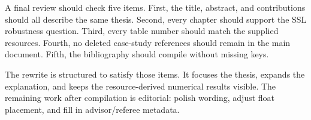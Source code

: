 A final review should check five items. First, the title, abstract, and contributions should all describe the same thesis. Second, every chapter should support the SSL robustness question. Third, every table number should match the supplied resources. Fourth, no deleted case-study references should remain in the main document. Fifth, the bibliography should compile without missing keys.

The rewrite is structured to satisfy those items. It focuses the thesis, expands the explanation, and keeps the resource-derived numerical results visible. The remaining work after compilation is editorial: polish wording, adjust float placement, and fill in advisor/referee metadata.
